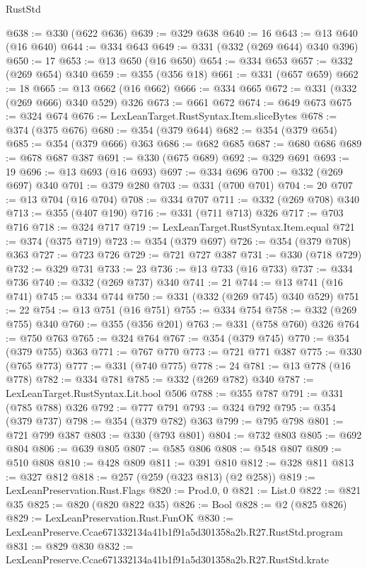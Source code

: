 \begin{lexlean}{RustStd}
\begin{coremodule}
@638 := @330 (@622 @636)
@639 := @329 @638
@640 := 16
@643 := @13 @640 (@16 @640)
@644 := @334 @643
@649 := @331 (@332 (@269 @644) @340 @396)
@650 := 17
@653 := @13 @650 (@16 @650)
@654 := @334 @653
@657 := @332 (@269 @654) @340
@659 := @355 (@356 @18)
@661 := @331 (@657 @659)
@662 := 18
@665 := @13 @662 (@16 @662)
@666 := @334 @665
@672 := @331 (@332 (@269 @666) @340 @529) @326
@673 := @661 @672
@674 := @649 @673
@675 := @324 @674
@676 := LexLeanTarget.RustSyntax.Item.sliceBytes
@678 := @374 (@375 @676)
@680 := @354 (@379 @644)
@682 := @354 (@379 @654)
@685 := @354 (@379 @666) @363
@686 := @682 @685
@687 := @680 @686
@689 := @678 @687 @387
@691 := @330 (@675 @689)
@692 := @329 @691
@693 := 19
@696 := @13 @693 (@16 @693)
@697 := @334 @696
@700 := @332 (@269 @697) @340
@701 := @379 @280
@703 := @331 (@700 @701)
@704 := 20
@707 := @13 @704 (@16 @704)
@708 := @334 @707
@711 := @332 (@269 @708) @340
@713 := @355 (@407 @190)
@716 := @331 (@711 @713) @326
@717 := @703 @716
@718 := @324 @717
@719 := LexLeanTarget.RustSyntax.Item.equal
@721 := @374 (@375 @719)
@723 := @354 (@379 @697)
@726 := @354 (@379 @708) @363
@727 := @723 @726
@729 := @721 @727 @387
@731 := @330 (@718 @729)
@732 := @329 @731
@733 := 23
@736 := @13 @733 (@16 @733)
@737 := @334 @736
@740 := @332 (@269 @737) @340
@741 := 21
@744 := @13 @741 (@16 @741)
@745 := @334 @744
@750 := @331 (@332 (@269 @745) @340 @529)
@751 := 22
@754 := @13 @751 (@16 @751)
@755 := @334 @754
@758 := @332 (@269 @755) @340
@760 := @355 (@356 @201)
@763 := @331 (@758 @760) @326
@764 := @750 @763
@765 := @324 @764
@767 := @354 (@379 @745)
@770 := @354 (@379 @755) @363
@771 := @767 @770
@773 := @721 @771 @387
@775 := @330 (@765 @773)
@777 := @331 (@740 @775)
@778 := 24
@781 := @13 @778 (@16 @778)
@782 := @334 @781
@785 := @332 (@269 @782) @340
@787 := LexLeanTarget.RustSyntax.Lit.bool @506
@788 := @355 @787
@791 := @331 (@785 @788) @326
@792 := @777 @791
@793 := @324 @792
@795 := @354 (@379 @737)
@798 := @354 (@379 @782) @363
@799 := @795 @798
@801 := @721 @799 @387
@803 := @330 (@793 @801)
@804 := @732 @803
@805 := @692 @804
@806 := @639 @805
@807 := @585 @806
@808 := @548 @807
@809 := @510 @808
@810 := @428 @809
@811 := @391 @810
@812 := @328 @811
@813 := @327 @812
@818 := @257 (@259 (@323 @813) (@2 @258))
@819 := LexLeanPreservation.Rust.Flags
@820 := Prod.{0, 0}
@821 := List.{0}
@822 := @821 @35
@825 := @820 (@820 @822 @35)
@826 := Bool
@828 := @2 (@825 @826)
@829 := LexLeanPreservation.Rust.FunOK
@830 := LexLeanPreserve.Ccae671332134a41b1f91a5d301358a2b.R27.RustStd.program
@831 := @829 @830
@832 := LexLeanPreserve.Ccae671332134a41b1f91a5d301358a2b.R27.RustStd.krate

\end{coremodule}
\end{lexlean}
